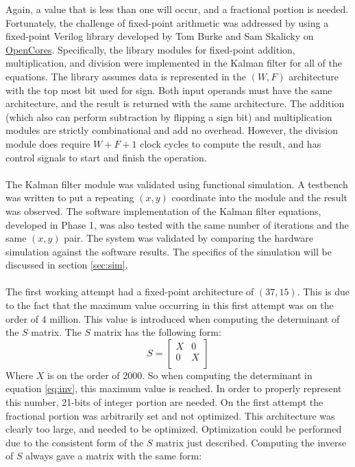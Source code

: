 \documentclass[11pt]{article} %
\begin{document}
Again, a value that is less than one will occur, and a fractional portion is needed. Fortunately, the challenge of fixed-point arithmetic was addressed by using a fixed-point Verilog library developed by Tom Burke and Sam Skalicky on \href{http://opencores.org/websvn,filedetails?repname=verilog_fixed_point_math_library&path=%2Fverilog_fixed_point_math_library%2Ftrunk%2FReadMe.txt}{OpenCores}. Specifically, the library modules for fixed-point addition, multiplication, and division were implemented in the Kalman filter for all of the equations. The library assumes data is represented in the $(W,F)$ architecture with the top most bit used for sign. Both input operands must have the same architecture, and the result is returned with the same architecture. The addition (which also can perform subtraction by flipping a sign bit) and multiplication modules are strictly combinational and add no overhead. However, the division module does require $W+F+1$ clock cycles to compute the result, and has control signals to start and finish the operation. \\\\
The Kalman filter module was validated using functional simulation. A testbench was written to put a repeating $(x,y)$ coordinate into the module and the result was observed. The software implementation of the Kalman filter equations, developed in Phase 1, was also tested with the same number of iterations and the same $(x,y)$ pair. The system was validated by comparing the hardware simulation against the software results. The specifics of the simulation will be discussed in section \ref{sec:sim}. \\\\ 
The first working attempt had a fixed-point architecture of $(37, 15)$. This is due to the fact that the maximum value occurring in this first attempt was on the order of 4 million. This value is introduced when computing the determinant of the $S$ matrix. The $S$ matrix has the following form:
\begin{equation}
S = 
\begin{bmatrix}
X & 0 \\
0 & X \\
\end{bmatrix}
\end{equation}
Where $X$ is on the order of 2000. So when computing the determinant in equation \ref{eq:inv}, this maximum value is reached. In order to properly represent this number, 21-bits of integer portion are needed. On the first attempt the fractional portion was arbitrarily set and not optimized. This architecture was clearly too large, and needed to be optimized. Optimization could be performed due to the consistent form of the $S$ matrix just described. Computing the inverse of $S$ always gave a matrix with the same form:
\end{document}
